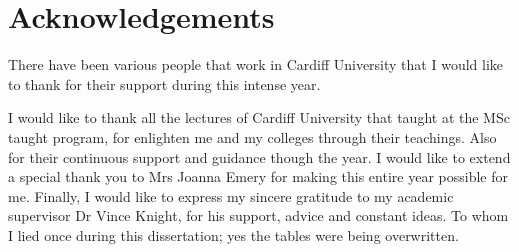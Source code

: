 \chapter{Acknowledgements}
There have been various people that work in Cardiff University that I would
like to thank for their support during this intense year.


I would like to thank all the lectures of Cardiff University that taught at
the MSc taught program, for enlighten me and my colleges through their teachings.
Also for their continuous support and guidance though the year.
I would like to extend a special thank you to Mrs Joanna Emery for making this
entire year possible for me. Finally, I would like to express my sincere gratitude
to my academic supervisor Dr Vince Knight, for his support, advice and constant
ideas. To whom I lied once during this dissertation; yes the tables were being
overwritten.
